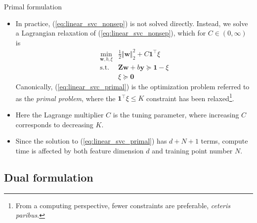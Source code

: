\documentclass{beamer}
\numberwithin{equation}{section}
\newcommand{\aref}[1]{\alert{\ref{#1}}}
\begin{document}
\begin{frame}{Primal formulation}
    \begin{itemize}
        \item
        In practice, (\aref{eq:linear_svc_nonsep}) is not solved
        directly. Instead, we solve a Lagrangian relaxation of
        (\aref{eq:linear_svc_nonsep}), which for $ C \in (0, \infty) $ is
        \begin{equation} \label{eq:linear_svc_primal}
            \begin{array}{ll}
                \displaystyle\min_{\mathbf{w}, b, \xi} &
                \frac{1}{2}\Vert\mathbf{w}\Vert_2^2 + C\mathbf{1}^\top\xi \\
                \text{s.t.} &
                \mathbf{Zw} + b\mathbf{y} \succeq \mathbf{1} - \xi \\
                & \xi \succeq \mathbf{0}
            \end{array}
        \end{equation}
        Canonically, (\aref{eq:linear_svc_primal}) is the optimization
        problem referred to as the \textit{primal problem}, where the
        $ \mathbf{1}^\top\xi \le K $ constraint has been relaxed\footnote{
            From a computing perspective, fewer constraints are
            preferable, \textit{ceteris paribus}.
        }.

        \item
        Here the Lagrange multiplier $ C $ is the tuning parameter, where
        increasing $ C $ corresponds to decreasing $ K $.

        \item
        Since the solution to (\aref{eq:linear_svc_primal}) has $ d + N + 1 $
        terms, compute time is affected by both feature dimension $ d $ and
        training point number $ N $.
    \end{itemize}
\end{frame}

\subsection{Dual formulation}
\end{document}
